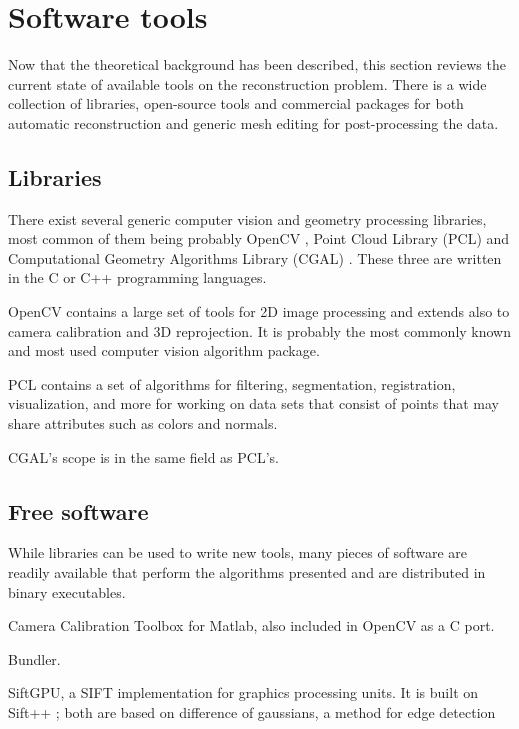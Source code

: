 \section{Software tools}

Now that the theoretical background has been described, this section reviews the current state of available tools on the reconstruction problem. There is a wide collection of libraries, open-source tools and commercial packages for both automatic reconstruction and generic mesh editing for post-processing the data.

\subsection{Libraries}

There exist several generic computer vision and geometry processing libraries, most common of them being probably OpenCV \cite{opencv}, Point Cloud Library (PCL) \cite{pcl} and Computational Geometry Algorithms Library (CGAL) \cite{cgal}. These three are written in the C or C++ programming languages.

OpenCV contains a large set of tools for 2D image processing and extends also to camera calibration and 3D reprojection.
It is probably the most commonly known and most used computer vision algorithm package.

PCL contains a set of algorithms for filtering, segmentation, registration, visualization, and more for working on data sets that consist of points that may share attributes such as colors and normals.

CGAL's scope is in the same field as PCL's.

\subsection{Free software}

While libraries can be used to write new tools, many pieces of software are readily available that perform the algorithms presented and are distributed in binary executables.

Camera Calibration Toolbox for Matlab, also included in OpenCV as a C port. \cite{camcalmatlab}

Bundler. \cite{snavely2006photo}

SiftGPU, a SIFT implementation for graphics processing units. \cite{changchang2007siftgpu} It is built on Sift++ \cite{vedaldi2011sift++}; both are based on difference of gaussians, a method for edge detection \cite{marr1980theory}

